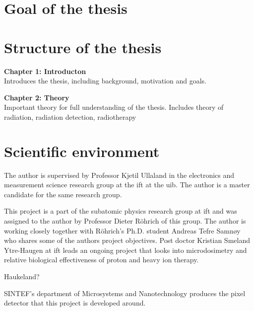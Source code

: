 \documentclass[../main/thesis.tex]{subfiles}
\begin{document}
\section{Goal of the thesis}
\label{i-goal}




\section{Structure of the thesis}
\label{i-structure}
\textbf{Chapter 1: Introducton}\\
Introduces the thesis, including background, motivation and goals.

\textbf{Chapter 2: Theory}\\
Important theory for full understanding of the thesis. Includes theory of radiation, radiation detection, radiotherapy




\section{Scientific environment}
\label{i-environment}
The author is supervised by Professor Kjetil Ullaland in the electronics and measurement science research group at the \gls{ift} at the \gls{uib}. The author is a master candidate for the same research group.

This project is a part of the subatomic physics research group at \gls{ift} and was assigned to the author by Professor Dieter Röhrich of this group. The author is working closely together with Röhrich's Ph.D. student Andreas Tefre Samnøy who shares some of the authors project objectives. Post doctor Kristian Smeland Ytre-Haugen at \gls{ift} leads an ongoing project that looks into microdosimetry and relative biological effectiveness of proton and heavy ion therapy. 

Haukeland?

SINTEF's department of Microsystems and Nanotechnology produces the pixel detector that this project is developed around. 
\end{document}
